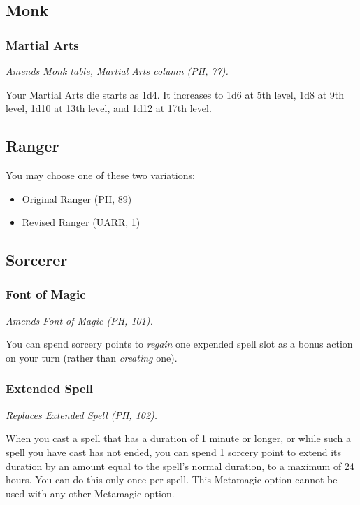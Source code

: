 \documentclass[letterpaper,twocolumn,openany,nodeprecatedcode]{dndbook}
\begin{document}
\subsection{Monk}

\subsubsection{Martial Arts}
\textit{Amends Monk table, Martial Arts column (PH, 77).}

Your Martial Arts die starts as 1d4. It increases to 1d6 at 5th level, 1d8 at 9th level, 1d10 at 13th level, and 1d12 at 17th level.



\subsection{Ranger}

You may choose one of these two variations:

\begin{itemize}
    \item Original Ranger (PH, 89)
    \item Revised Ranger (UARR, 1)

\end{itemize}

\subsection{Sorcerer}

\subsubsection{Font of Magic}
\textit{Amends Font of Magic (PH, 101).}

You can spend sorcery points to \textit{regain} one expended spell slot as a bonus action on your turn (rather than \textit{creating} one).

\subsubsection{Extended Spell}
\textit{Replaces Extended Spell (PH, 102).}

When you cast a spell that has a duration of 1 minute or longer, or while such a spell you have cast has not ended, you can spend 1 sorcery point to extend its duration by an amount equal to the spell's normal duration, to a maximum of 24 hours. You can do this only once per spell. This Metamagic option cannot be used with any other Metamagic option.
\end{document}
